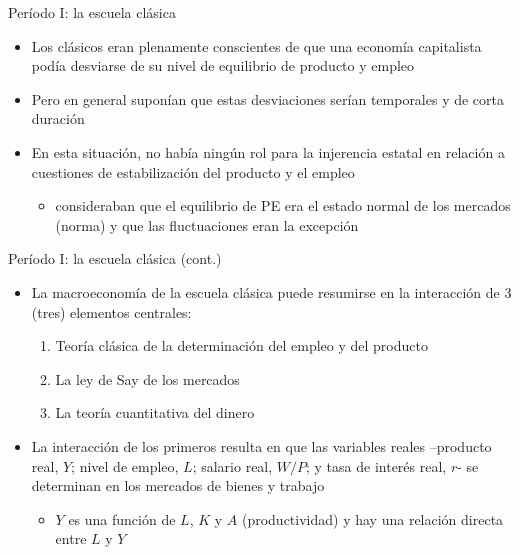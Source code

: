 \documentclass[
  ignorenonframetext,
]{beamer}
\providecommand{\tightlist}{%
  \setlength{\itemsep}{0pt}\setlength{\parskip}{0pt}}\usepackage{longtable,booktabs,array}
\begin{document}
\begin{frame}{Período I: la escuela clásica}
\protect\hypertarget{peruxedodo-i-la-escuela-cluxe1sica}{}
\begin{itemize}
\tightlist
\item
  Los clásicos eran plenamente conscientes de que una economía
  capitalista podía desviarse de su nivel de equilibrio de producto y
  empleo
\item
  Pero en general suponían que estas desviaciones serían temporales y de
  corta duración
\item
  En esta situación, no había ningún rol para la injerencia estatal en
  relación a cuestiones de estabilización del producto y el empleo

  \begin{itemize}
  \tightlist
  \item
    consideraban que el equilibrio de PE era el estado normal de los
    mercados (norma) y que las fluctuaciones eran la excepción
  \end{itemize}
\end{itemize}
\end{frame}

\begin{frame}{Período I: la escuela clásica (cont.)}
\protect\hypertarget{peruxedodo-i-la-escuela-cluxe1sica-cont.}{}
\begin{itemize}
\tightlist
\item
  La macroeconomía de la escuela clásica puede resumirse en la
  interacción de 3 (tres) elementos centrales:

  \begin{enumerate}
  \tightlist
  \item
    Teoría clásica de la determinación del empleo y del producto
  \item
    La ley de Say de los mercados
  \item
    La teoría cuantitativa del dinero
  \end{enumerate}
\item
  La interacción de los primeros resulta en que las variables reales
  --producto real, \(Y\); nivel de empleo, \(L\); salario real, \(W/P\);
  y tasa de interés real, \(r\)- se determinan en los mercados de bienes
  y trabajo

  \begin{itemize}
  \tightlist
  \item
    \(Y\) es una función de \(L\), \(K\) y \(A\) (productividad) y hay
    una relación directa entre \(L\) y \(Y\)
  \end{itemize}
\end{itemize}
\end{frame}
\end{document}
